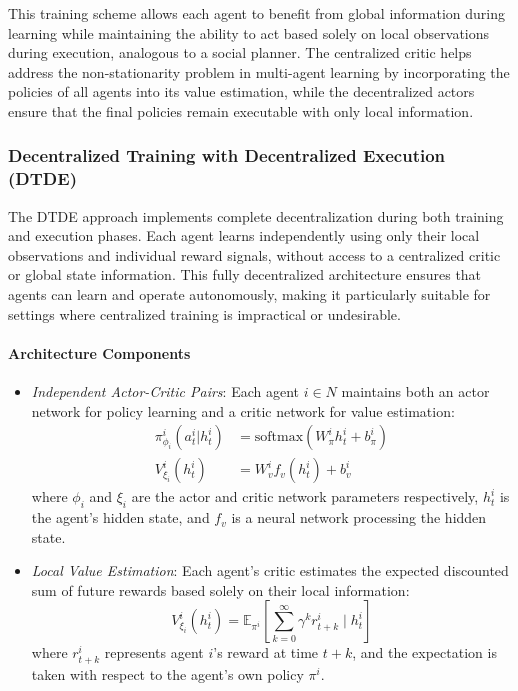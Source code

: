 This training scheme allows each agent to benefit from global information during learning while maintaining the ability to act based solely on local observations during execution, analogous to a social planner. The centralized critic helps address the non-stationarity problem in multi-agent learning by incorporating the policies of all agents into its value estimation, while the decentralized actors ensure that the final policies remain executable with only local information.

\subsubsection*{Decentralized Training with Decentralized Execution (DTDE)}

The DTDE approach implements complete decentralization during both training and execution phases. Each agent learns independently using only their local observations and individual reward signals, without access to a centralized critic or global state information. This fully decentralized architecture ensures that agents can learn and operate autonomously, making it particularly suitable for settings where centralized training is impractical or undesirable.

\paragraph{Architecture Components}
\begin{itemize}
    \item \textit{Independent Actor-Critic Pairs}: Each agent $i \in N$ maintains both an actor network for policy learning and a critic network for value estimation:
    \begin{align*}
        \pi^i_{\phi_i}(a^i_t|h^i_t) &= \text{softmax}(W^i_{\pi}h^i_t + b^i_{\pi}) \\
        V^i_{\xi_i}(h^i_t) &= W^i_v f_v(h^i_t) + b^i_v
    \end{align*}
    where $\phi_i$ and $\xi_i$ are the actor and critic network parameters respectively, $h^i_t$ is the agent's hidden state, and $f_v$ is a neural network processing the hidden state.
    
    \item \textit{Local Value Estimation}: Each agent's critic estimates the expected discounted sum of future rewards based solely on their local information:
    \[
        V^i_{\xi_i}(h^i_t) = \mathbb{E}_{\pi^i}\left[\sum_{k=0}^{\infty} \gamma^k r_{t+k}^i \mid h^i_t\right]
    \]
    where $r_{t+k}^i$ represents agent $i$'s reward at time $t+k$, and the expectation is taken with respect to the agent's own policy $\pi^i$.
\end{itemize}

